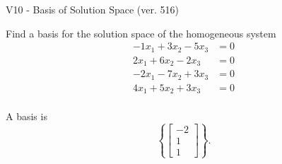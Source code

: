 \begin{exercise}
  \begin{exerciseTitle}V10 - Basis of Solution Space (ver. 516)\end{exerciseTitle}
  \begin{exerciseStatement}
    Find a basis for the solution space of the homogeneous system 
\begin{align*}
 -1 x_ 1 + 3 x_ 2 -5 x_ 3 &= 0  \\ 
  2 x_ 1 + 6 x_ 2 -2 x_ 3 &= 0  \\ 
  -2 x_ 1 -7 x_ 2 + 3 x_ 3 &= 0  \\ 
  4 x_ 1 + 5 x_ 2 + 3 x_ 3 &= 0  \\ 
 \end{align*}


 
  \end{exerciseStatement}

  \begin{exerciseAnswer}
   A basis is   
\[\left\{\left[\begin{array}{c}
-2 \\
1 \\
1
\end{array}\right]\right\}.\]

  


  \end{exerciseAnswer}
\end{exercise}